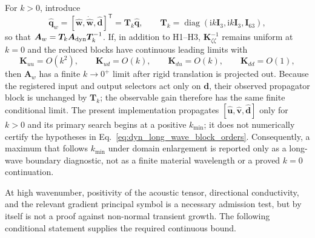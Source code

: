 For $k>0$, introduce
\begin{equation}
 \widehat{\boldsymbol q}_w
 =[\widehat{\boldsymbol w},\dot{\widehat{\boldsymbol w}},
   \widehat{\boldsymbol d}]^{\mathsf T}
 =\boldsymbol T_k\widehat{\boldsymbol q},
 \qquad
 \boldsymbol T_k=\operatorname{diag}
 (\mathrm{i}k\boldsymbol I_3,\mathrm{i}k\boldsymbol I_3,
  \boldsymbol I_{63}),
 \label{eq:dyn_long_wave_transform}
\end{equation}
so that
$\boldsymbol A_w=\boldsymbol T_k\boldsymbol A_{\rm dyn}
\boldsymbol T_k^{-1}$.  If, in addition to H1--H3,
$\boldsymbol K_{\zeta\zeta}^{-1}$ remains uniform at $k=0$ and the reduced
blocks have continuous leading limits with
\begin{equation}
 \boldsymbol K_{uu}=O(k^2),\qquad
 \boldsymbol K_{ud}=O(k),\qquad
 \boldsymbol K_{du}=O(k),\qquad
 \boldsymbol K_{dd}=O(1),
 \label{eq:dyn_long_wave_block_orders}
\end{equation}
then $\boldsymbol A_w$ has a finite $k\rightarrow0^+$ limit after rigid
translation is projected out.  Because the registered input and output
selectors act only on $\boldsymbol d$, their observed propagator block is
unchanged by $\boldsymbol T_k$; the observable gain therefore has the same
finite conditional limit.  The present implementation propagates
$[\widehat{\boldsymbol u},\widehat{\boldsymbol v},\widehat{\boldsymbol d}]$
only for $k>0$ and its primary search begins at a positive $k_{\min}$; it does
not numerically certify the hypotheses in
Eq.~\eqref{eq:dyn_long_wave_block_orders}.  Consequently, a maximum that
follows $k_{\min}$ under domain enlargement is reported only as a long-wave
boundary diagnostic, not as a finite material wavelength or a proved
$k=0$ continuation.

At high wavenumber, positivity of the acoustic tensor, directional
conductivity, and the relevant gradient principal symbol is a necessary
admission test, but by itself is not a proof against non-normal transient
growth.  The following conditional statement supplies the required continuous
bound.

